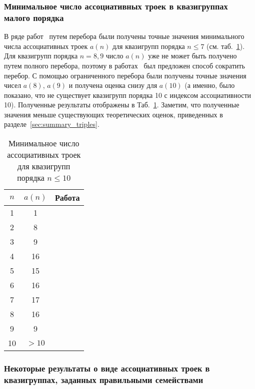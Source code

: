 \subsubsection{Минимальное число ассоциативных троек в квазигруппах малого порядка}
    В ряде работ~\cite{ass_summary, groek11, valent16} путем перебора были получены точные значения минимального числа ассоциативных троек $a(n)$ для квазигрупп порядка $n \le 7$ (см. таб.~\ref{tab:assoctriples}).
    Для квазигрупп порядка $n = 8, 9$ число $a(n)$ уже не может быть получено путем полного перебора, поэтому в работах~\cite{valent2018small, drapal2019high, drapal2020extreme} был предложен способ сократить перебор.
    С помощью ограниченного перебора были получены точные значения чисел $a(8)$, $a(9)$ и получена оценка снизу для $a(10)$ (а именно, было показано, что не существует квазигрупп порядка 10 с индексом ассоциативности 10).
    Полученные результаты отображены в Таб.~\ref{tab:assoctriples}.
    Заметим, что полученные значения меньше существующих теоретических оценок, приведенных в разделе~\ref{sec:summary_triples}.
    \begin{table}
        \centering
        \captionsetup{justification=centering} %
        \caption{\label{tab:assoctriples} Минимальное число ассоциативных троек для квазигрупп порядка $n \le 10$}
        \begin{tabular}{c|c|c}
            $n$ & $a(n)$ & Работа \\ 
            \toprule
            1 & 1  & \cite{ass_summary} \\
            2 & 8  & \cite{ass_summary} \\
            3 & 9  & \cite{ass_summary} \\
            4 & 16 & \cite{ass_summary} \\
            5 & 15 & \cite{ass_summary} \\
            6 & 16 & \cite{ass_summary} \\
            7 & 17 & \cite{valent16} \\
            8 & 16 & \cite{drapal2019high} \\
            9 & 9  & \cite{valent2018small}  \\
            10 & $>10$ & \cite{drapal2020extreme} \\
            \bottomrule
        \end{tabular}
    \end{table}

\subsubsection{Некоторые результаты о виде ассоциативных троек в квазигруппах, заданных правильными семействами}
\label{sec:assoctriples_proper}

